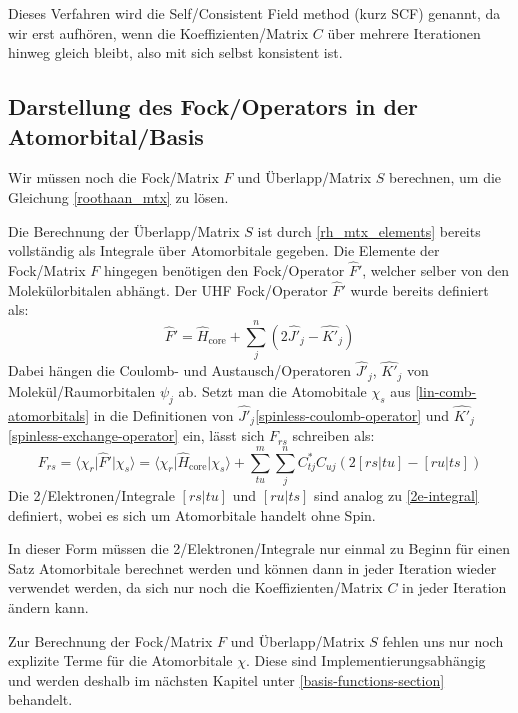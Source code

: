 Dieses Verfahren wird die Self\-/Consistent Field method (kurz SCF) genannt,
da wir erst aufhören, wenn die Koeffizienten\-/Matrix $C$
über mehrere Iterationen hinweg gleich bleibt, also mit sich selbst konsistent ist.\\


\subsection{Darstellung des Fock\-/Operators in der Atomorbital\-/Basis}\label{F_S_mtx_calc}

Wir müssen noch die Fock\-/Matrix $F$ und Überlapp\-/Matrix $S$ berechnen,
um die Gleichung \cref{roothaan_mtx} zu lösen.

Die Berechnung der Überlapp\-/Matrix $S$ ist durch \cref{rh_mtx_elements} bereits vollständig
als Integrale über Atomorbitale gegeben.
Die Elemente der Fock\-/Matrix $F$ hingegen benötigen den Fock\-/Operator $\hat{F}'$,
welcher selber von den Molekülorbitalen abhängt.
Der UHF Fock\-/Operator $\hat{F}'$ wurde bereits definiert als:
\begin{equation}
    \hat{F}' = \hat{H}_{\text{core}} + \sum_j^{n}
    \left( 2\hat{J'}_j - \hat{K'}_j \right)
\end{equation}
Dabei hängen die Coulomb- und Austausch\-/Operatoren $\hat{J'}_j$, $\hat{K'}_j$
von Molekül\-/Raumorbitalen $\psi_j$ ab.
Setzt man die Atomobitale $\chi_s$ aus \cref{lin-comb-atomorbitals} in
die Definitionen von $\hat{J'}_j$\cref{spinless-coulomb-operator} und
$\hat{K'}_j$ \cref{spinless-exchange-operator} ein, lässt sich $F_{r s}$ schreiben als:
\begin{equation}
    F_{rs} = \langle \chi_r \vert \hat{F}' \vert \chi_s \rangle
    = \langle \chi_r \vert \hat{H}_{\text{core}} \vert \chi_s \rangle
    + \sum_{tu}^m \sum_j^{n} C_{tj}^*C_{uj}\left( 2[rs\vert tu] - [ru\vert ts] \right)
\end{equation}
Die 2\-/Elektronen\-/Integrale $[rs\vert tu]$ und $[ru\vert ts]$
sind analog zu \cref{2e-integral} definiert, wobei es sich um Atomorbitale handelt ohne Spin.

In dieser Form müssen die 2\-/Elektronen\-/Integrale nur einmal
zu Beginn für einen Satz Atomorbitale berechnet werden und
können dann in jeder Iteration wieder verwendet werden,
da sich nur noch die Koeffizienten\-/Matrix $C$ in jeder Iteration ändern kann.

Zur Berechnung der Fock\-/Matrix $F$ und Überlapp\-/Matrix $S$
fehlen uns nur noch explizite Terme für die Atomorbitale $\chi$.
Diese sind Implementierungsabhängig und werden deshalb im nächsten Kapitel
unter \cref{basis-functions-section} behandelt.

